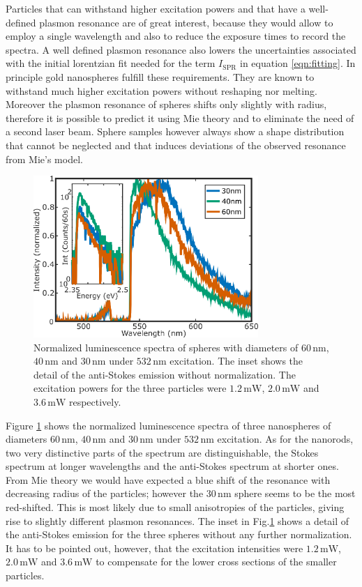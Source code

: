 \documentclass[journal=nalefd,manuscript=letter]{achemso}
\newcommand{\nm}{\ensuremath{\,\textrm{nm}}}
\newcommand{\mW}{\ensuremath{\,\textrm{mW}}}
\begin{document}
 Particles that can withstand higher excitation powers and that have a
 well-defined plasmon resonance are of great interest, because they would allow
 to employ a single wavelength and also to reduce the exposure times to record
 the spectra. A well defined plasmon resonance also lowers the uncertainties
 associated with the initial lorentzian fit needed for the term $I_\textrm{SPR}$
 in equation \ref{eqn:fitting}. In principle gold nanospheres fulfill these
 requirements. They are known to withstand much higher excitation powers without
 reshaping nor melting\cite{Hou2015}. Moreover the plasmon resonance of spheres
 shifts only slightly with radius, therefore it is possible to predict it using
 Mie theory and to eliminate the need of a second laser beam. Sphere samples
 however always show a shape distribution that cannot be neglected\cite{Lee2013}
 and that induces deviations of the observed resonance from Mie's model.
 
 \begin{figure}[tp] \centering
 \includegraphics[width=85.2mm]{Figures/07_Spheres/07_spheres.png}
 \caption{Normalized luminescence spectra of spheres with diameters of $60\nm$,
 $40\nm$ and $30\nm$ under $532\nm$ excitation. The inset shows the detail of the anti-Stokes emission without normalization.
 The excitation powers for the three particles were $1.2\mW$, $2.0\mW$ and
 $3.6\mW$ respectively.}
 	\label{fig:spheres}
 \end{figure}
 
 Figure \ref{fig:spheres} shows the normalized luminescence spectra of three
 nanospheres of diameters $60\nm$, $40\nm$ and $30\nm$ under $532\nm$ excitation.
 As for the nanorods, two very distinctive parts of the spectrum are
 distinguishable, the Stokes spectrum at longer wavelengths and the anti-Stokes
 spectrum at shorter ones. From Mie theory we would have expected a blue
 shift of the resonance with decreasing radius of the particles; however the
 $30\nm$ sphere seems to be the most red-shifted. This is most likely due to small anisotropies of the
 particles, giving rise to slightly different plasmon resonances. The inset in
 Fig.\ref{fig:spheres} shows a detail of the anti-Stokes emission for the three
 spheres without any further normalization. It has to be pointed out, however,
 that the excitation intensities were $1.2\mW$, $2.0\mW$ and $3.6\mW$ to
 compensate for the lower cross sections of the smaller particles.
 
\end{document}

